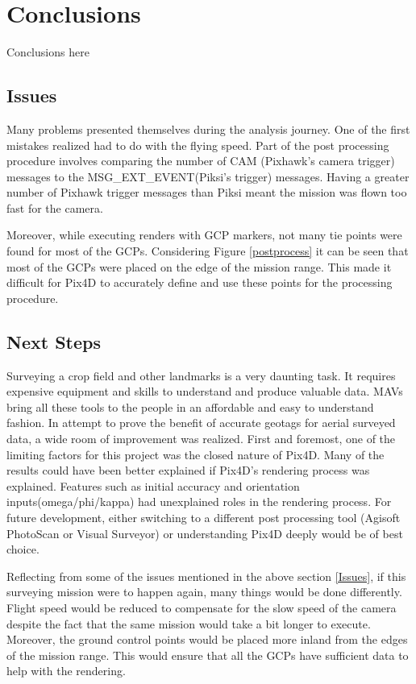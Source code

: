 \documentclass{article}
\begin{document}
\section{Conclusions}
Conclusions here
\subsection{Issues}
Many problems presented themselves during the analysis journey. One of the first mistakes realized 
had to do with the flying speed. Part of the post processing procedure involves comparing the number 
of CAM (Pixhawk's camera trigger) messages to the MSG_EXT_EVENT(Piksi's trigger) messages. Having a 
greater number of Pixhawk trigger messages than Piksi meant the mission was flown too fast for the 
camera. 

Moreover, while executing renders with GCP markers, not many tie points were found for most of the GCPs. Considering Figure \ref{postprocess} it can be seen that most of the GCPs were placed on the
edge of the mission range. This made it difficult for Pix4D to accurately define and use these 
points for the processing procedure.




\subsection{Next Steps}
Surveying a crop field and other landmarks is a very daunting task. It requires expensive equipment 
and skills to understand and produce valuable data. MAVs bring all these tools to the people in an 
affordable and easy to understand fashion. In attempt to prove the benefit of accurate geotags for 
aerial surveyed data, a wide room of improvement was realized. First and foremost, one of the 
limiting factors for this project was the closed nature of Pix4D. Many of the results could have 
been better explained if Pix4D's rendering process was explained. Features such as initial accuracy 
and orientation inputs(omega/phi/kappa) had unexplained roles in the rendering process. For future 
development, either switching to a different post processing tool (Agisoft PhotoScan or Visual 
Surveyor) or understanding Pix4D deeply would be of best choice.

Reflecting from some of the issues mentioned in the above section \ref{Issues}, if this surveying mission were to happen again, many things would be done differently. Flight speed would be reduced to compensate for the slow speed of the camera despite the fact that the same mission would take a bit longer to execute. Moreover, the ground control points would be placed more inland from the edges of the mission range. This would ensure that all the GCPs have sufficient data to help with the rendering. 
\end{document}

